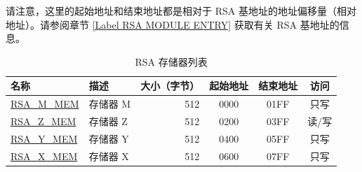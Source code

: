 
请注意，这里的起始地址和结束地址都是相对于 RSA 基地址的地址偏移量（相对地址）。请参阅章节 \ref{Label RSA MODULE ENTRY} 获取有关 RSA 基地址的信息。

\label{regdesc:RSAmemory}
\begin{longtable}{ | p{3cm} | p{3cm} | r | c | c | c | }
\caption{RSA 存储器列表} \label{table:RSA-Memory-Blocks}
\\\hline
\rowcolor{lightgray}
名称 & 描述 &  大小（字节） & 起始地址 & 结束地址 & 访问 \\ \hline
\hyperref[regdesc:RSAmemory]{RSA\_M\_MEM} & 存储器 M  & 512   & \hexprefix{}0000 & \hexprefix{}01FF & 只写 \\ \hline
\hyperref[regdesc:RSAmemory]{RSA\_Z\_MEM} & 存储器 Z  & 512  & \hexprefix{}0200 & \hexprefix{}03FF & 读/写 \\ \hline
\hyperref[regdesc:RSAmemory]{RSA\_Y\_MEM} & 存储器 Y  & 512  & \hexprefix{}0400 & \hexprefix{}05FF & 只写 \\ \hline
\hyperref[regdesc:RSAmemory]{RSA\_X\_MEM} & 存储器 X  & 512  & \hexprefix{}0600 & \hexprefix{}07FF & 只写 \\ \hline

\end{longtable}
